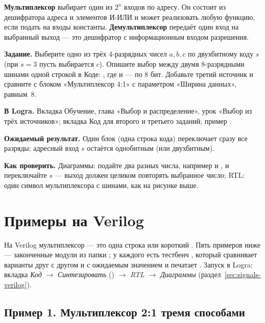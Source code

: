 \begin{ideabox}
\textbf{Мультиплексор} выбирает один из $2^n$ входов по адресу. Он состоит из
дешифратора адреса и элементов И-ИЛИ и может реализовать любую функцию, если
подать на входы константы. \textbf{Демультиплексор} передаёт один вход на
выбранный выход --- это дешифратор с информационным входом разрешения.
\end{ideabox}

\begin{diybox}
\textbf{Задание.}  Выберите одно из трёх 4-разрядных чисел $a,b,c$
по двухбитному коду $s$ (при $s=3$ пусть выбирается $c$).  Опишите
выбор между двумя 8-разрядными шинами одной строкой в Коде:
, где  и  --- по 8 бит.
 Добавьте третий источник и сравните с блоком «Мультиплексор 4:1»
с параметром «Ширина данных», равным~8.

\textbf{В Logra.} Вкладка Обучение, глава «Выбор и распределение», урок
«Выбор из трёх источников»; вкладка Код для второго и третьего заданий; пример
.

\textbf{Ожидаемый результат.} Один блок (одна строка кода) переключает сразу
все разряды; адресный вход $s$ остаётся однобитным (или двухбитным).

\textbf{Как проверить.} Диаграммы: подайте два разных числа, например 
и , и переключайте $s$ --- выход должен целиком повторять выбранное
число; RTL: один символ мультиплексора с шинами, как на рисунке выше.
\end{diybox}

\section{Примеры на Verilog}
\label{sec:mux-verilog}

На Verilog мультиплексор --- это одна строка или короткий .
Пять примеров ниже --- законченные модули из папки ; у
каждого есть тестбенч , который сравнивает варианты друг с другом
и с ожидаемым значением и печатает . Запуск в Logra: вкладка
\emph{Код} $\to$ \emph{Синтезировать} () $\to$ \emph{RTL}
$\to$ \emph{Диаграммы} (раздел~\ref{sec:signals-verilog}).

\subsection{Пример 1. Мультиплексор 2:1 тремя способами}

